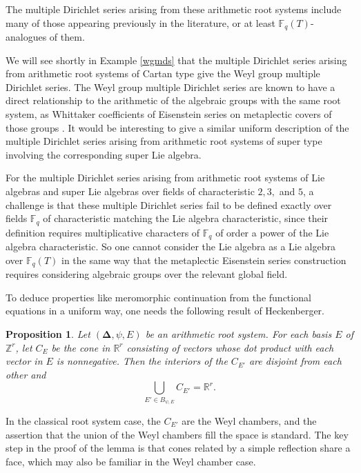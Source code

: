 \documentclass[11pt,letterpaper]{article}
\newtheorem{prop}[theorem]{Proposition}
\theoremstyle{definition}
\theoremstyle{remark}
\numberwithin{equation}{section}
\theoremstyle{dotless}
\newcommand{\hchi}{\psi} %
\begin{document}
The multiple Dirichlet series arising from these arithmetic root systems include many of those appearing previously in the literature, or at least $\mathbb F_q(T)$-analogues of them.

We will see shortly in Example \ref{wgmds} that the multiple Dirichlet series arising from arithmetic root systems of Cartan type give the Weyl group multiple Dirichlet series. The Weyl group multiple Dirichlet series are known to have a direct relationship to the arithmetic of the algebraic groups with the same root system, as Whittaker coefficients of Eisenstein series on metaplectic covers of those groups \cite{McNamara, PatnaikPuskas, Chen}. It would be interesting to give a similar uniform description of the multiple Dirichlet series arising from arithmetic root systems of super type involving the corresponding super Lie algebra. 

For the multiple Dirichlet series arising from arithmetic root systems of Lie algebras and super Lie algebras over fields of characteristic $2,3,$ and $5$, a challenge is that these multiple Dirichlet series fail to be defined exactly over fields $\mathbb F_q$ of characteristic matching the Lie algebra characteristic, since their definition requires multiplicative characters of $\mathbb F_q$ of order a power of the Lie algebra characteristic. So one cannot consider the Lie algebra as a Lie algebra over $\mathbb F_q(T)$ in the same way that the metaplectic Eisenstein series construction requires considering algebraic groups over the relevant global field.





To deduce properties like meromorphic continuation from the functional equations in a uniform way, one needs the following result of Heckenberger.

\begin{prop}\label{cone-union-lemma} Let $(\mathbf \Delta, \hchi, E)$ be an arithmetic root system. For each basis $E$ of $\mathbb Z^r$, let $C_E$ be the cone in $\mathbb R^r$ consisting of vectors whose dot product with each vector in $E$ is nonnegative. Then the interiors of the $C_{E'}$ are disjoint from each other and \[ \bigcup_{E' \in B_{\hchi,E}} C_{E'} = \mathbb R^r .\] \end{prop}

In the classical root system case, the $C_{E'}$ are the Weyl chambers, and the assertion that the union of the Weyl chambers fill the space is standard. The key step in the proof of the lemma is that cones related by a simple reflection share a face, which may also be familiar in the Weyl chamber case.
\end{document}
